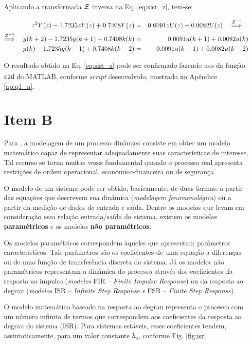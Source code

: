 Aplicando a transformada $\mathcal{Z}$ inversa na Eq. \ref{eq:sist_z}, tem-se:

\begin{eqnarray}
z^2Y(z) - 1.7235zY(z) + 0.7408Y(z) & = & 0.0091zU(z) + 0.0082U(z)
\quad\stackrel{\mathcal{Z}^{-1}}{\Longrightarrow}\quad\nonumber\\
\stackrel{\mathcal{Z}^{-1}}{\Longrightarrow}\quad
y(k+2) - 1.7235y(k+1) + 0.7408k(k) & = & 
0.0091u(k+1) + 0.0082u(k)\nonumber\\
y(k) - 1.7235y(k-1) + 0.7408k(k-2) & = & 
0.0091u(k-1) + 0.0082u(k-2)\label{eq:yk}
\end{eqnarray}

O resultado obtido na Eq. \ref{eq:sist_z} pode ser confirmado fazendo uso da
função {\tt c2d} do MATLAB\textsuperscript{\textregistered}, conforme {\it
script} desenvolvido, mostrado no Apêndice \ref{ap:q1_a}.

\section*{Item B}
Para , a modelagem de um processo dinâmico consiste em
obter um modelo matemático capaz de representar adequadamente suas
características de interesse. Tal recurso se torna muitas vezes fundamental
quando o processo real apresenta restrições de ordem operacional,
econômico-financeira ou de segurança.

O modelo de um sistema pode ser obtido, basicamente, de duas formas: a partir
das equações que descrevem sua dinâmica ({\it modelagem fenomenológica}) ou a
partir da medição de dados de entrada e saída. Dentre os modelos que levam em
consideração essa relação entrada/saída do sistema, existem os modelos {\bf
paramétricos} e os modelos {\bf não paramétricos}.

Os modelos paramétricos correspondem àqueles que apresentam parâmetros
característicos. Tais parâmetros são os coeficientes de uma equação a diferenças
ou de uma função de transferência discreta do sistema. Já os modelos não
paramétricos representam a dinâmica do processo através dos coeficientes da
resposta ao impulso ({\it modelos} FIR -- {\it Finite Impulse Response}) ou da
resposta ao degrau ({\it modelos} ISR -- {\it Infinite Step Response} {\it e}
FSR -- {\it Finite Step Response}). \cite{santos:2007}

O modelo matemático baseado na resposta ao degrau representa o processo com um
número infinito de termos que correspondem aos coeficientes da resposta ao
degrau do sistema (ISR). Para sistemas estáveis, esses coeficientes tendem,
assintoticamente, para um valor constante $h_s$, conforme Fig. \ref{fig:isr}.


